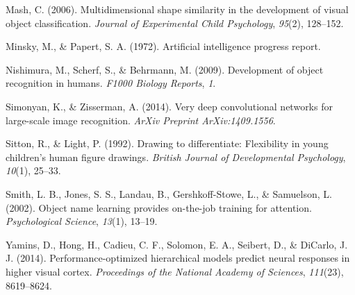 \documentclass[10pt, letterpaper]{article}
\begin{document}
\hypertarget{ref-mash2006}{}
Mash, C. (2006). Multidimensional shape similarity in the development of
visual object classification. \emph{Journal of Experimental Child
Psychology}, \emph{95}(2), 128--152.

\hypertarget{ref-minsky1972artificial}{}
Minsky, M., \& Papert, S. A. (1972). Artificial intelligence progress
report.

\hypertarget{ref-nishimura2009}{}
Nishimura, M., Scherf, S., \& Behrmann, M. (2009). Development of object
recognition in humans. \emph{F1000 Biology Reports}, \emph{1}.

\hypertarget{ref-simonyan2014very}{}
Simonyan, K., \& Zisserman, A. (2014). Very deep convolutional networks
for large-scale image recognition. \emph{ArXiv Preprint
ArXiv:1409.1556}.

\hypertarget{ref-sitton1992drawing}{}
Sitton, R., \& Light, P. (1992). Drawing to differentiate: Flexibility
in young children's human figure drawings. \emph{British Journal of
Developmental Psychology}, \emph{10}(1), 25--33.

\hypertarget{ref-smith2002object}{}
Smith, L. B., Jones, S. S., Landau, B., Gershkoff-Stowe, L., \&
Samuelson, L. (2002). Object name learning provides on-the-job training
for attention. \emph{Psychological Science}, \emph{13}(1), 13--19.

\hypertarget{ref-yamins2014performance}{}
Yamins, D., Hong, H., Cadieu, C. F., Solomon, E. A., Seibert, D., \&
DiCarlo, J. J. (2014). Performance-optimized hierarchical models predict
neural responses in higher visual cortex. \emph{Proceedings of the
National Academy of Sciences}, \emph{111}(23), 8619--8624.

\vspace{2em}
\vspace{1em}
\end{document}
